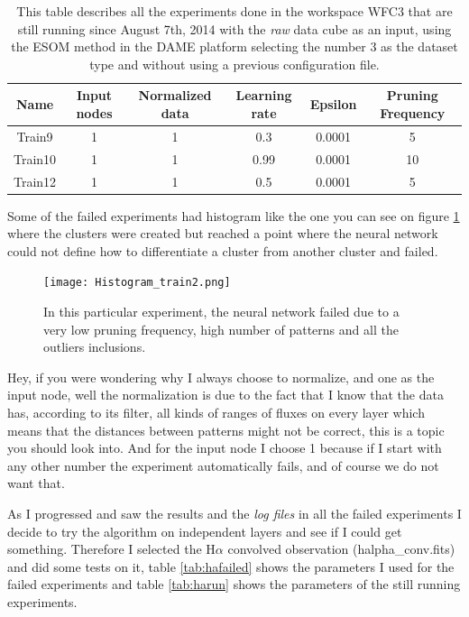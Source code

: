 \documentclass[11pt,fleqn]{book} %
\begin{document}
\begin{table}[h!]
  \centering
    \begin{tabular}{ c c c c c c }
    \hline\hline
    
    Name & Input nodes & Normalized data & Learning rate & Epsilon & Pruning Frequency\\
    \hline
    
    Train9 & 1 & 1 & 0.3 & 0.0001 & 5\\
    Train10 & 1 & 1 & 0.99 & 0.0001 & 10\\
    Train12 & 1 & 1 & 0.5 & 0.0001 & 5\\
    
    \hline
  \end{tabular}
  \caption{This table describes all the experiments done in the workspace WFC3 that are still running since August 7th, 2014 with the \emph{raw} data cube as an input, using the ESOM method in the DAME platform selecting the number 3 as the dataset type and without using a previous configuration file.}
  \label{tab:ds9running}
\end{table}

Some of the failed experiments had histogram like the one you can see on figure \ref{img:faildtrain2} where the clusters were created but reached a point where the neural network could not define how to differentiate a cluster from another cluster and failed.

\begin{figure}[h!]
	\centering
    \texttt{[image: Histogram\_train2.png]}
    \caption{In this particular experiment, the neural network failed due to a very low pruning frequency, high number of patterns and all the outliers inclusions.}
    \label{img:faildtrain2}
\end{figure}

Hey, if you were wondering why I always choose to normalize, and one as the input node, well the normalization is due to the fact that I know that the data has, according to its filter, all kinds of ranges of fluxes on every layer which means that the distances between patterns might not be correct, this is a topic you should look into. And for the input node I choose 1 because if I start with any other number the experiment automatically fails, and of course we do not want that.

As I progressed and saw the results and the \emph{log files} in all the failed experiments I decide to try the algorithm on independent layers and see if I could get something. Therefore I selected the H$\alpha$ convolved observation (halpha\_conv.fits) and did some tests on it, table \ref{tab:hafailed} shows the parameters I used for the failed experiments and table \ref{tab:harun} shows the parameters of the still running experiments.
\end{document}
